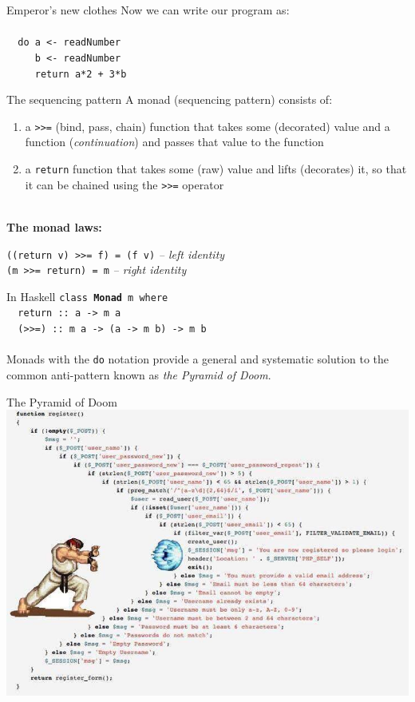 \documentclass{beamer}
\begin{document}
\begin{frame}{Emperor's new clothes}
  Now we can write our program as: \\
  \texttt{ \\
    \ \ do a <- readNumber\\
    \ \ \ \ \ b <- readNumber \\
    \ \ \ \ \ return a*2 + 3*b
  }
\end{frame}

\begin{frame}{The sequencing pattern} \pause
  A monad (sequencing pattern) consists of: \pause
  \begin{enumerate}
  \item a \texttt{>>=} (bind, pass, chain) function
    that takes some (decorated) value and a function (\textit{continuation}) and
    passes that value to the function \pause
  \item a \texttt{return} function that takes some
    (raw) value and lifts (decorates) it, so that it
    can be chained using the \texttt{>>=} operator \pause
  \end{enumerate}
  \ \\ \textbf{The monad laws:} \pause
 
  \texttt{((return v) >>= f) = (f v)} \pause \textit{-- left identity} \\ \pause
  \texttt{(m >>= return) = m} \pause \textit{-- right identity}
\end{frame}

\begin{frame}{In Haskell} \pause
  \texttt{class \textbf{Monad} m where\\ \pause
    \ \ return\ ::\ a -> m a\\ \pause
    \ \ (>>=)\ ::\ m a -> (a -> m b) -> m b\\ \pause
  } \ \\
  Monads with the \texttt{do} notation provide a general
  and systematic solution to the common anti-pattern known
  as \textit{the Pyramid of Doom}.
\end{frame}

\begin{frame}{The Pyramid of Doom}
  \includegraphics[width=\textwidth]{pyramid-of-doom.jpg}  
\end{frame}
\end{document}
